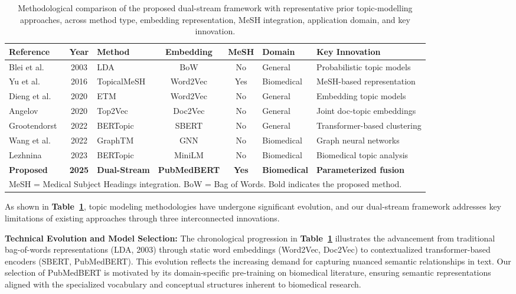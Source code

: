 \documentclass[authorproof,JACIII,researchpaper]{fujipressarticle}
\begin{document}
{\color{red}%
\begin{table}[!t]
\centering
\caption{Methodological comparison of the proposed dual-stream framework with representative prior topic-modelling approaches, across method type, embedding representation, MeSH integration, application domain, and key innovation.}
\label{tab:comparison}
\renewcommand{\arraystretch}{1.3}
\begin{tabular}{lclccll}
\hline
\textbf{Reference} & \textbf{Year} & \textbf{Method} & \textbf{Embedding} & \textbf{MeSH} & \textbf{Domain} & \textbf{Key Innovation} \\
\hline
Blei et al.~\cite{blei_latent_2003} & 2003 & LDA & BoW & No & General & Probabilistic topic models \\
Yu et al.~\cite{yu_improving_2016} & 2016 & TopicalMeSH & Word2Vec & Yes & Biomedical & MeSH-based representation \\
Dieng et al.~\cite{dieng_topic_2020} & 2020 & ETM & Word2Vec & No & General & Embedding topic models \\
Angelov~\cite{angelov_top2vec_2020} & 2020 & Top2Vec & Doc2Vec & No & General & Joint doc-topic embeddings \\
Grootendorst~\cite{grootendorst_bertopic_2022} & 2022 & BERTopic & SBERT & No & General & Transformer-based clustering \\
Wang et al.~\cite{wang_graph-embedded_2022} & 2022 & GraphTM & GNN & No & Biomedical & Graph neural networks \\
Lezhnina~\cite{lezhnina_depression_2023} & 2023 & BERTopic & MiniLM & No & Biomedical & Biomedical topic analysis \\
\hline
\textbf{Proposed} & \textbf{2025} & \textbf{Dual-Stream} & \textbf{PubMedBERT} & \textbf{Yes} & \textbf{Biomedical} & \textbf{Parameterized fusion} \\
\hline
\multicolumn{7}{l}{\footnotesize MeSH = Medical Subject Headings integration. BoW = Bag of Words. Bold indicates the proposed method.} \\
\end{tabular}
\end{table}
}%

{\color{red}As shown in \textbf{Table~\ref{tab:comparison}}, topic modeling methodologies have undergone significant evolution, and our dual-stream framework addresses key limitations of existing approaches through three interconnected innovations.}

{\color{red}\textbf{Technical Evolution and Model Selection:} The chronological progression in \textbf{Table~\ref{tab:comparison}} illustrates the advancement from traditional bag-of-words representations (LDA, 2003) through static word embeddings (Word2Vec, Doc2Vec) to contextualized transformer-based encoders (SBERT, PubMedBERT).} This evolution reflects the increasing demand for capturing nuanced semantic relationships in text. Our selection of PubMedBERT is motivated by its domain-specific pre-training on biomedical literature, ensuring semantic representations aligned with the specialized vocabulary and conceptual structures inherent to biomedical research.
\end{document}
